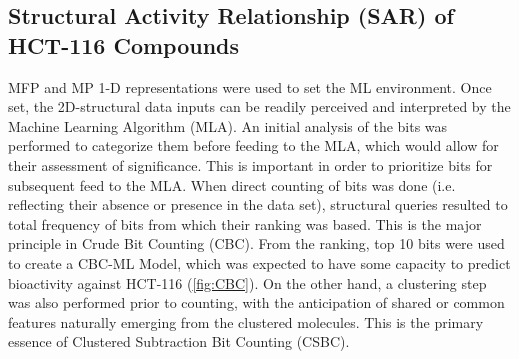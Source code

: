 
\subsection*{Structural Activity Relationship (SAR) of HCT-116 Compounds}
MFP and MP 1-D representations were used to set the ML environment. Once set, the 2D-structural data inputs can be readily perceived and interpreted by the Machine Learning Algorithm (MLA). An initial analysis of the bits was performed to categorize them before feeding to the MLA, which would allow for their assessment of significance. This is important in order to prioritize bits for subsequent feed to the MLA. When direct counting of bits was done (i.e. reflecting their absence or presence in the data set), structural queries resulted to total frequency of bits from which their ranking was based. This is the major principle in Crude Bit Counting (CBC). From the ranking, top 10 bits were used to create a CBC-ML Model, which was expected to have some capacity to predict bioactivity against HCT-116 (\autoref{fig:CBC}). On the other hand, a clustering step was also performed prior to counting, with the anticipation of shared or common features naturally emerging from the clustered molecules. This is the primary essence of Clustered Subtraction Bit Counting (CSBC).

  

